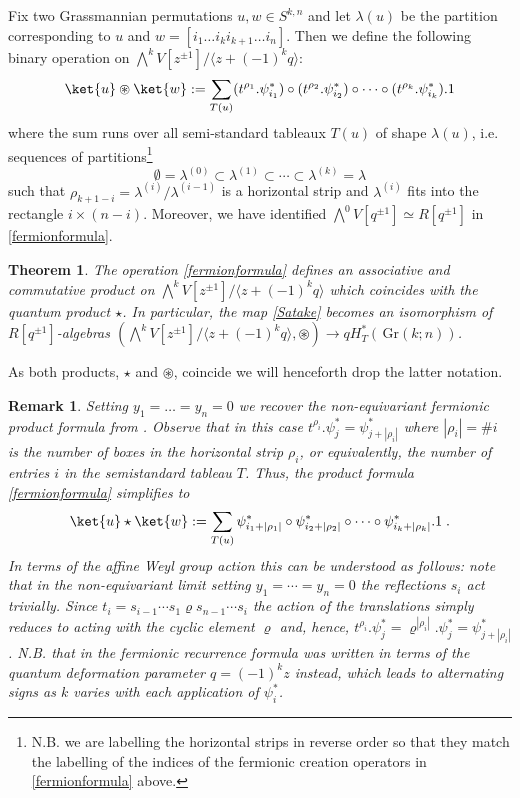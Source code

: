 \documentclass[12pt]{amsart}
\newcommand{\Gr}{\,\mathrm{Gr}}
\newcommand{\ring}{R}
\newtheorem{remark}{Remark}[section]
\newtheorem{thm}{Theorem}[section]
\numberwithin{equation}{section}
\numberwithin{figure}{section}
\begin{document}
Fix two Grassmannian permutations $u,w\in S^{k,n}$ and let $\lambda(u)$ be the partition corresponding to $u$ and $w=[i_1\ldots i_ki_{k+1}\ldots i_n]$. Then we define the following binary operation on $\bigwedge^kV[z^{\pm1}]/\langle z+(-1)^kq\rangle$: 
    \begin{equation}
    \label{fermionformula}
        \ket{u} \circledast \ket{w} := \sum\limits_{T(u)} (t^{\rho_1}. \psi^{*}_{i_1})\circ (t^{\rho_{2}}.\psi^*_{i_{2}})\circ \cdots\circ(t^{\rho_k}.\psi^*_{i_k}).1
    \end{equation}
    where the sum runs over all semi-standard tableaux $T(u)$ of shape $\lambda(u)$, i.e. sequences of partitions\footnote{N.B. we are labelling the horizontal strips in reverse order so that they match the labelling of the indices of the fermionic creation operators in \eqref{fermionformula} above.}
\[
\emptyset=\lambda^{(0)}\subset\lambda^{(1)}\subset\cdots\subset\lambda^{(k)}=\lambda
\]
such that $\rho_{k+1-i}=\lambda^{(i)}/\lambda^{(i-1)}$ is a horizontal strip  and $\lambda^{(i)}$ fits into the rectangle $i\times(n-i)$. Moreover, we have identified $\bigwedge^0V[q^{\pm 1}]\simeq\ring[q^{\pm1}]$ in \eqref{fermionformula}.
\begin{thm}\label{thm:fermion}
    The operation \eqref{fermionformula} defines an associative and commutative product on $\bigwedge^kV[z^{\pm1}]/\langle z+(-1)^kq\rangle$ which coincides with the quantum product $\star$. In particular, the map \eqref{Satake} becomes an isomorphism of $\ring[q^{\pm 1}]$-algebras $(\bigwedge^kV[z^{\pm1}]/\langle z+(-1)^kq\rangle,\circledast)\to qH^*_T(\Gr(k;n))$. 
\end{thm}
As both products, $\star$ and $\circledast$, coincide we will henceforth drop the latter notation.
\begin{remark}\rm
    Setting $y_1=\ldots=y_n=0$ we recover the non-equivariant fermionic product formula from \cite[Eqn (1.5)]{Korff09}. Observe that in this case $t^{\rho_i}.\psi^*_j=\psi^*_{j+|\rho_i|}$ where $|\rho_i|=\#i$ is the number of boxes in the horizontal strip $\rho_i$, or equivalently, the number of entries $i$ in the semistandard tableau $T$. Thus, the product formula \eqref{fermionformula} simplifies to
    \begin{equation}
        \ket{u} \star \ket{w} := \sum\limits_{T(u)} \psi^{*}_{i_1+|\rho_1|}\circ\psi^*_{i_{2}+|\rho_{2}|}\circ \cdots\circ\psi^*_{i_k+|\rho_k|}.1\;.
    \end{equation}
    In terms of the affine Weyl group action this can be understood as follows: note that in the non-equivariant limit setting $y_1=\cdots=y_n=0$ the reflections $s_i$ act trivially. Since $t_i=s_{i-1}\cdots s_1\varrho s_{n-1}\cdots s_i$ the action of the translations simply reduces to acting with the cyclic element $\varrho$ and, hence, $t^{\rho_i}.\psi^*_j=\varrho^{|\rho_i|}.\psi^*_j=\psi^*_{j+|\rho_i|}$. N.B. that in \cite{Korff09} the fermionic recurrence formula was written in terms of the quantum deformation parameter $q=(-1)^kz$ instead, which leads to alternating signs as $k$ varies with each application of $\psi^*_i$. 
\end{remark}
\end{document}
